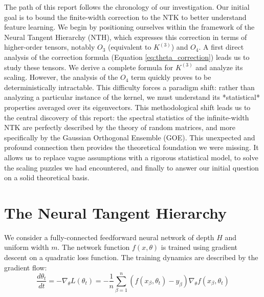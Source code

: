 \documentclass{article}
\begin{document}
The path of this report follows the chronology of our investigation. Our initial goal is to bound the finite-width correction to the NTK to better understand feature learning. We begin by positioning ourselves within the framework of the Neural Tangent Hierarchy (NTH), which expresses this correction in terms of higher-order tensors, notably $O_3$ (equivalent to $K^{(3)}$) and $O_4$. A first direct analysis of the correction formula (Equation \ref{eq:theta_correction}) leads us to study these tensors. We derive a complete formula for $K^{(3)}$ and analyze its scaling. However, the analysis of the $O_4$ term quickly proves to be deterministically intractable. This difficulty forces a paradigm shift: rather than analyzing a particular instance of the kernel, we must understand its *statistical* properties averaged over its eigenvectors. This methodological shift leads us to the central discovery of this report: the spectral statistics of the infinite-width NTK are perfectly described by the theory of random matrices, and more specifically by the Gaussian Orthogonal Ensemble (GOE). This unexpected and profound connection then provides the theoretical foundation we were missing. It allows us to replace vague assumptions with a rigorous statistical model, to solve the scaling puzzles we had encountered, and finally to answer our initial question on a solid theoretical basis.

\newpage
\section{The Neural Tangent Hierarchy}

We consider a fully-connected feedforward neural network of depth $H$ and uniform width $m$. The network function $f(x, \theta)$ is trained using gradient descent on a quadratic loss function. The training dynamics are described by the gradient flow:
\begin{equation}
\frac{d\theta_t}{dt} = -\nabla_\theta L(\theta_t) = -\frac{1}{n} \sum_{\beta=1}^n (f(x_\beta, \theta_t) - y_\beta) \nabla_\theta f(x_\beta, \theta_t)
\end{equation}
\end{document}
